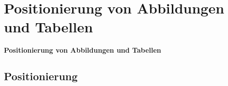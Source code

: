 \documentclass["WS\space 16-17\space -\space LaTeX-Kurs\space -\space Praesentation\space -\space 2.tex"]{subfiles}
\begin{document}
\section{Positionierung von Abbildungen und Tabellen}
\begin{frame}[c]
	\begin{center}
		\LARGE \textbf{Positionierung von Abbildungen und Tabellen}
	\end{center}
\end{frame}
\subsection*{Positionierung}
\end{document}
